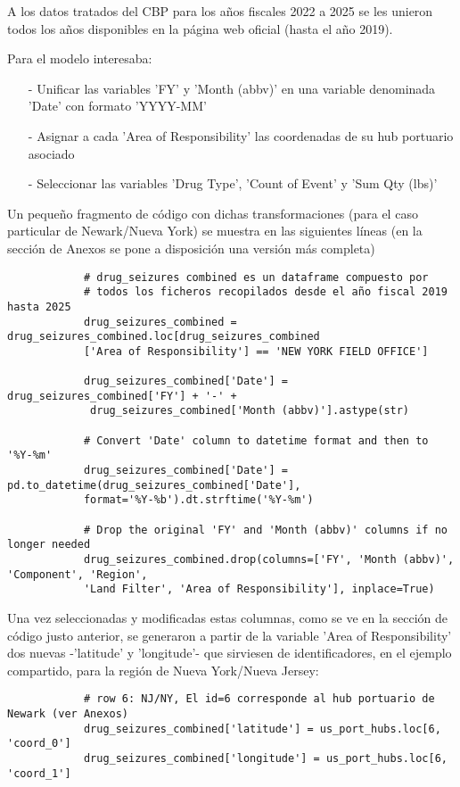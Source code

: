 \documentclass[12pt]{article}
\begin{document}
		A los datos tratados del CBP para los años fiscales 2022 a 2025 se les unieron todos los años disponibles en la página web oficial (hasta el año 2019).
		
		Para el modelo interesaba:
		\begin{itemize}
			\item [-] Unificar las variables 'FY' y 'Month (abbv)' en una variable denominada 'Date' con formato 'YYYY-MM'
			\item [-] Asignar a cada 'Area of Responsibility' las coordenadas de su hub portuario asociado
			\item [-] Seleccionar las variables 'Drug Type', 'Count of Event' y 'Sum Qty (lbs)'
		\end{itemize}
	
		Un pequeño fragmento de código con dichas transformaciones (para el caso particular de Newark/Nueva York) se muestra en las siguientes líneas (en la sección de Anexos se pone a disposición una versión más completa)
		
		\begin{verbatim}
			# drug_seizures combined es un dataframe compuesto por
			# todos los ficheros recopilados desde el año fiscal 2019 hasta 2025
			drug_seizures_combined = drug_seizures_combined.loc[drug_seizures_combined
			['Area of Responsibility'] == 'NEW YORK FIELD OFFICE']
			
			drug_seizures_combined['Date'] = drug_seizures_combined['FY'] + '-' +
			 drug_seizures_combined['Month (abbv)'].astype(str)
			 
			# Convert 'Date' column to datetime format and then to '%Y-%m'
			drug_seizures_combined['Date'] = pd.to_datetime(drug_seizures_combined['Date'],
			format='%Y-%b').dt.strftime('%Y-%m')
			
			# Drop the original 'FY' and 'Month (abbv)' columns if no longer needed
			drug_seizures_combined.drop(columns=['FY', 'Month (abbv)', 'Component', 'Region', 
			'Land Filter', 'Area of Responsibility'], inplace=True)
		\end{verbatim}
	
		
		Una vez seleccionadas y modificadas estas columnas, como se ve en la sección de código justo anterior, se generaron a partir de la variable 'Area of Responsibility' dos nuevas -'latitude' y 'longitude'- que sirviesen de identificadores, en el ejemplo compartido, para la región de Nueva York/Nueva Jersey:
		
		\begin{verbatim}
			# row 6: NJ/NY, El id=6 corresponde al hub portuario de Newark (ver Anexos)
			drug_seizures_combined['latitude'] = us_port_hubs.loc[6, 'coord_0']
			drug_seizures_combined['longitude'] = us_port_hubs.loc[6, 'coord_1']
		\end{verbatim}
	
\end{document}
